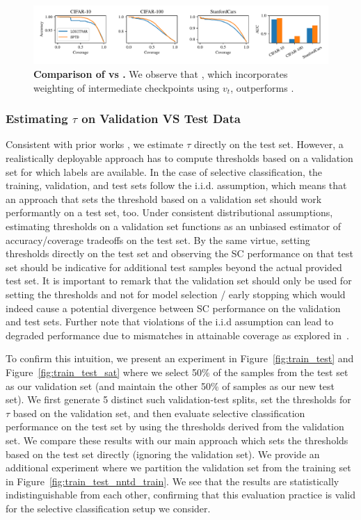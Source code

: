 \begin{figure}[t]
  \centering
  \includegraphics[width=\linewidth]{figs/sptd/logitvariance.pdf}
\caption[Comparison of \logitvar vs \sptd.]{\textbf{Comparison of \logitvar vs \sptd.} We observe that \sptd, which incorporates weighting of intermediate checkpoints using $v_t$, outperforms \logitvar.
}
\label{fig:logitvar}
\end{figure}

\subsubsection{Estimating $\tau$ on Validation VS Test Data}

Consistent with prior works \citep{geifman2017selective, liu2019deep, huang2020self, feng2023towards}, we estimate $\tau$ directly on the test set. However, a realistically deployable approach has to compute thresholds based on a validation set for which labels are available. In the case of selective classification, the training, validation, and test sets follow the i.i.d. assumption, which means that an approach that sets the threshold based on a validation set should work performantly on a test set, too. Under consistent distributional assumptions, estimating thresholds on a validation set functions as an unbiased estimator of accuracy/coverage tradeoffs on the test set. By the same virtue, setting thresholds directly on the test set and observing the SC performance on that test set should be indicative for additional test samples beyond the actual provided test set. It is important to remark that the validation set should only be used for setting the thresholds and not for model selection / early stopping which would indeed cause a potential divergence between SC performance on the validation and test sets. Further note that violations of the i.i.d assumption can lead to degraded performance due to mismatches in attainable coverage as explored in~\cite{bar2023window}.

To confirm this intuition, we present an experiment in Figure~\ref{fig:train_test} and Figure~\ref{fig:train_test_sat} where we select 50\% of the samples from the test set as our validation set (and maintain the other 50\% of samples as our new test set). We first generate 5 distinct such validation-test splits, set the thresholds for $\tau$ based on the validation set, and then evaluate selective classification performance on the test set by using the thresholds derived from the validation set. We compare these results with our main approach which sets the thresholds based on the test set directly (ignoring the validation set). We provide an additional experiment where we partition the validation set from the training set in Figure~\ref{fig:train_test_nntd_train}. We see that the results are statistically indistinguishable from each other, confirming that this evaluation practice is valid for the selective classification setup we consider. 


